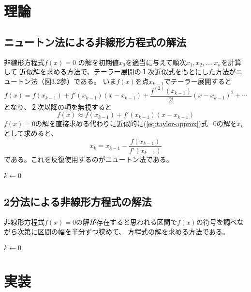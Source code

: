 \documentclass[12pt,a4paper]{ltjsreport}
\begin{document}
\section{理論}
\subsection{ニュートン法による非線形方程式の解法}
非線形方程式$f(x) = 0$
の解を初期値$x_0$を適当に与えて順次$x_1,x_2,\ldots,x_n$を計算して
近似解を求める方法で、テーラー展開の１次近似式をもとにした方法がニュートン法（図3.2参）である。
いま$f(x)$を点$x_{k-1}$でテーラー展開すると
\begin{equation}
f(x)=f(x_{k-1})+f'(x_{k-1})(x - x_{k-1})+ \frac{f^{(2)}(x_{k-1})}{2!}(x-x_{k-1})^2+\cdots
\end{equation}
となり、２次以降の項を無視すると
\begin{equation}\label{eq:taylor-approx}
f(x)\approx f(x_{k-1})+f'(x_{k-1})(x-x_{k-1})
\end{equation}
$f(x)=0$の解を直接求める代わりに近似的に(\ref{eq:taylor-approx})式=0の解を$x_k$として求めると、
\begin{equation}
x_k = x_{k-1} - \frac{f(x_{k-1})}{f'(x_{k-1})}
\end{equation}
である。これを反復使用するのがニュートン法である。

\begin{algorithm}[H]
\caption{ニュートン法のアルゴリズム}
$k \leftarrow 0$\;
\end{algorithm}

\subsection{2分法による非線形方程式の解法}
非線形方程式$f(x)=0$の解が存在すると思われる区間で$f(x)$の符号を調べながら次第に区間の幅を半分ずつ狭めて、
方程式の解を求める方法である。

\begin{algorithm}[H]
\caption{２分法のアルゴリズム}
$k \leftarrow 0$\;
\end{algorithm}

\section{実装}
\end{document}
